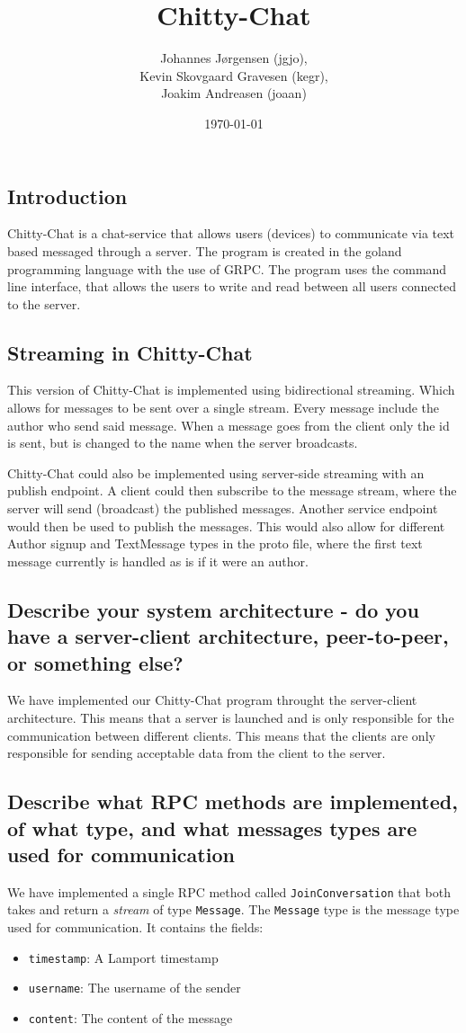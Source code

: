 \documentclass[a4paper,11pt]{article}
\title{Chitty-Chat}
\author{Johannes Jørgensen (jgjo),\\ Kevin Skovgaard Gravesen (kegr),\\ Joakim Andreasen (joaan)}
\date{\today}
\begin{document}
 

\maketitle

\subsection*{Introduction}
Chitty-Chat is a chat-service that allows users (devices) to communicate via text based messaged through a server. The program is created in the goland programming language with the use of GRPC.
The program uses the command line interface, that allows the users to write and read between all users connected to the server.

\subsection*{Streaming in Chitty-Chat}
This version of Chitty-Chat is implemented using bidirectional streaming. Which allows for messages to be sent over a single stream.
Every message include the author who send said message. When a message goes from the client only the id is sent, but is changed to the name when the server broadcasts.

Chitty-Chat could also be implemented using server-side streaming with an publish endpoint.
A client could then subscribe to the message stream, where the server will send (broadcast) the published messages.
Another service endpoint would then be used to publish the messages.
This would also allow for different Author signup and TextMessage types in the proto file, where the first text message currently is handled as is if it were an author.

\subsection*{Describe your system architecture - do you have a server-client architecture, peer-to-peer, or something else?}
We have implemented our Chitty-Chat program throught the server-client architecture. 
This means that a server is launched and is only responsible for the communication between different clients. This means that the clients are only responsible for
sending acceptable data from the client to the server.

\subsection*{Describe what  RPC methods are implemented, of what type, and what messages types are used for communication}
We have implemented a single RPC method called \verb|JoinConversation| that both takes and return a \textit{stream} of type \verb|Message|.
The \verb|Message| type is the message type used for communication. It contains the fields:
\begin{itemize}
    \item \verb|timestamp|: A Lamport timestamp
    \item \verb|username|: The username of the sender
    \item \verb|content|: The content of the message
\end{itemize} 
\newpage
\end{document}

